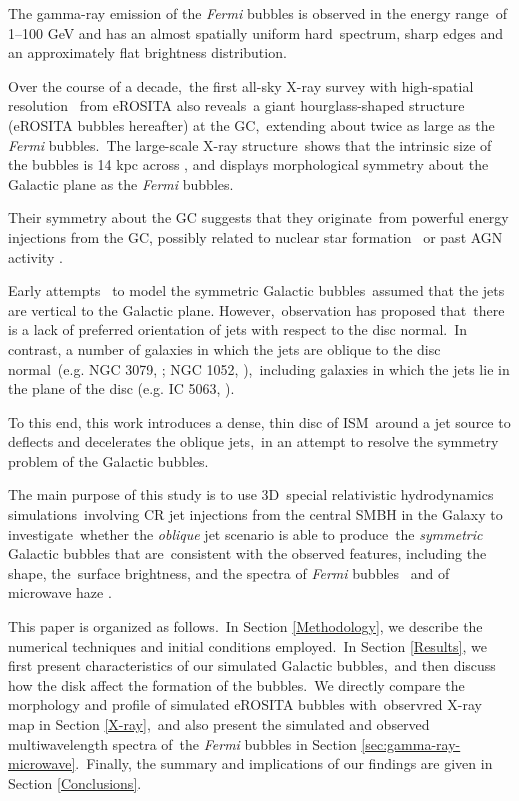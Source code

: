 \documentclass[twocolumn]{aastex631}
\begin{document}
The gamma-ray emission of the \textit{Fermi} bubbles is observed in the energy range\
of 1--100 GeV and has an almost spatially uniform hard\
spectrum, sharp edges and an approximately flat brightness distribution.\

Over the course of a decade,\
the first all-sky X-ray survey with high-spatial resolution \citep{Predehl2021}\
from eROSITA \citep{Predehl2020} also reveals\
a giant hourglass-shaped structure (eROSITA bubbles hereafter) at the GC,\
extending about twice as large as the \textit{Fermi} bubbles.\
The large-scale X-ray structure\
shows that the intrinsic size of the bubbles is 14 kpc across \citep{Predehl2021},
and displays morphological symmetry about the Galactic plane as the \textit{Fermi} bubbles.

Their symmetry about the GC suggests that they originate\
from powerful energy injections from the GC, possibly related to nuclear star formation\
\citep{PhysRevLett.106.101102,Carretti2013}
or past AGN activity \citep{Guo2012,Yang2017}.

Early attempts \citep{Sarkar2015,Yang2017,Zhang2020}\
to model the symmetric Galactic bubbles\
assumed that the jets are vertical to the Galactic plane. However,\
observation \citep{Gallimore2006} has proposed that\
there is a lack of preferred orientation of jets with respect to the disc normal.\
In contrast, a number of galaxies in which the jets are oblique to the disc normal\
(e.g. NGC 3079, \citealt{Cecil2001}; NGC 1052, \citealt{Dopita2015}),\
including galaxies in which the jets lie in the plane of the disc (e.g. IC 5063, \citealt{Morganti2015}).

To this end, this work introduces a dense, thin disc of ISM\
around a jet source to deflects and decelerates the oblique jets,\
in an attempt to resolve the symmetry problem of the Galactic bubbles.\

The main purpose of this study is to use 3D\
special relativistic hydrodynamics simulations\
involving CR jet injections from the central SMBH in the Galaxy to investigate\
whether the \textit{oblique} jet scenario is able to produce\
the \textit{symmetric} Galactic bubbles that are\
consistent with the observed features, including the shape, the\
surface brightness, and the spectra of \textit{Fermi} bubbles \citep{Ackermann2014}\
and of microwave haze \citep{Dobler_2008,PlanckCollaborationIX2013}.

This paper is organized as follows.\
In Section \ref{Methodology}, we describe the numerical techniques and initial conditions employed.\
In Section \ref{Results}, we first present characteristics of our simulated Galactic bubbles,\
and then discuss how the disk affect the formation of the bubbles.\
We directly compare the morphology and profile of simulated eROSITA bubbles with\
observred X-ray map in Section \ref{X-ray},\
and also present the simulated and observed multiwavelength spectra of\
the \textit{Fermi} bubbles in Section \ref{sec:gamma-ray-microwave}.\
Finally, the summary and implications of our findings are given in Section \ref{Conclusions}.
\end{document}
